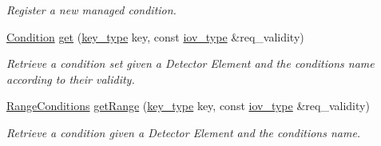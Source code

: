 \begin{DoxyCompactItemize}
\begin{DoxyCompactList}\small\item\em Register a new managed condition. \end{DoxyCompactList}\item 
\hyperlink{class_d_d4hep_1_1_conditions_1_1_condition}{Condition} \hyperlink{class_d_d4hep_1_1_conditions_1_1_conditions_manager_object_a1a0fa030dcff8247de5ed6f93ccb16c5}{get} (\hyperlink{class_d_d4hep_1_1_conditions_1_1_conditions_manager_object_ac44eafc69174743e81d2f60e1f510719}{key\+\_\+type} key, const \hyperlink{class_d_d4hep_1_1_conditions_1_1_conditions_manager_object_a0190ec510ca46da4a1cc908ac3c3a1dd}{iov\+\_\+type} \&req\+\_\+validity)
\begin{DoxyCompactList}\small\item\em Retrieve a condition set given a Detector Element and the conditions name according to their validity. \end{DoxyCompactList}\item 
\hyperlink{namespace_d_d4hep_1_1_conditions_ae765f0140a33973a430280f02b6062f4}{Range\+Conditions} \hyperlink{class_d_d4hep_1_1_conditions_1_1_conditions_manager_object_aca98e38d7025351eb289feafa2cece97}{get\+Range} (\hyperlink{class_d_d4hep_1_1_conditions_1_1_conditions_manager_object_ac44eafc69174743e81d2f60e1f510719}{key\+\_\+type} key, const \hyperlink{class_d_d4hep_1_1_conditions_1_1_conditions_manager_object_a0190ec510ca46da4a1cc908ac3c3a1dd}{iov\+\_\+type} \&req\+\_\+validity)
\begin{DoxyCompactList}\small\item\em Retrieve a condition given a Detector Element and the conditions name. \end{DoxyCompactList}\end{DoxyCompactItemize}
